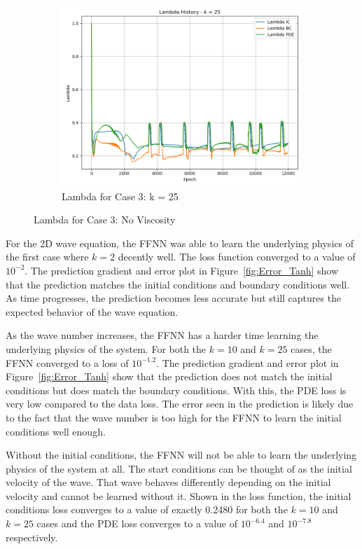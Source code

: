\documentclass[11pt]{article}
\begin{document}
\begin{figure}[h!]
\begin{subfigure}[b]{0.48\textwidth}
        \includegraphics[width=\textwidth]{2D_Lambda_K3.png}
        \caption{Lambda for Case 3: k = 25}
        \label{fig:Lambda_K3}
    \end{subfigure}
    \caption{Lambda for Case 3: No Viscosity}
    \label{fig:Lambda_Tanh}
\end{figure}

For the 2D wave equation, the FFNN was able to learn the underlying physics of the first case where $k=2$ decently well. The loss function converged to a value of $10^{-2}$. The prediction gradient and error plot in Figure~\ref{fig:Error_Tanh} show that the prediction matches the initial conditions and boundary conditions well. As time progresses, the prediction becomes less accurate but still captures the expected behavior of the wave equation.

As the wave number increases, the FFNN has a harder time learning the underlying physics of the system. For both the $k=10$ and $k=25$ cases, the FFNN converged to a loss of $10^{-1.2}$. The prediction gradient and error plot in Figure~\ref{fig:Error_Tanh} show that the prediction does not match the initial conditions but does match the boundary conditions. With this, the PDE loss is very low compared to the data loss. The error seen in the prediction is likely due to the fact that the wave number is too high for the FFNN to learn the initial conditions well enough.

Without the initial conditions, the FFNN will not be able to learn the underlying physics of the system at all. The start conditions can be thought of as the initial velocity of the wave. That wave behaves differently depending on the initial velocity and cannot be learned without it. Shown in the loss function, the initial conditions loss converges to a value of exactly 0.2480 for both the $k=10$ and $k=25$ cases and the PDE loss converges to a value of $10^{-6.4}$ and $10^{-7.8}$ respectively. 
\end{document}

